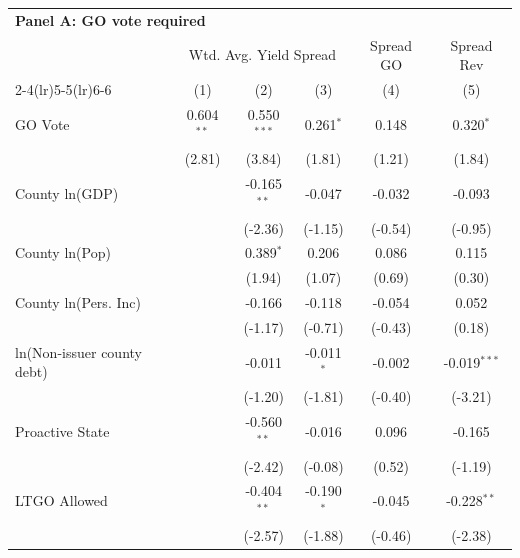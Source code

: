 \begingroup
\centering
\begin{tabular*}{\textwidth}{@{\extracolsep{\fill}}lccccc}
\multicolumn{6}{l}{\textbf{Panel A: GO vote required}}\\

\addlinespace
   \toprule
    & \multicolumn{3}{c}{Wtd. Avg. Yield Spread} & Spread GO & Spread Rev\\
   \cmidrule(lr){2-4}\cmidrule(lr){5-5}\cmidrule(lr){6-6}
                              & (1)          & (2)            & (3)            & (4)            & (5)\\  
   \midrule 
   GO Vote                    & 0.604$^{**}$ & 0.550$^{***}$  & 0.261$^{*}$    & 0.148          & 0.320$^{*}$\\   
                              & (2.81)      & (3.84)        & (1.81)        & (1.21)        & (1.84)\\   
   County ln(GDP)             &              & -0.165$^{**}$  & -0.047         & -0.032         & -0.093\\   
                              &              & (-2.36)       & (-1.15)       & (-0.54)       & (-0.95)\\   
   County ln(Pop)             &              & 0.389$^{*}$    & 0.206          & 0.086          & 0.115\\   
                              &              & (1.94)        & (1.07)        & (0.69)        & (0.30)\\   
   County ln(Pers. Inc)       &              & -0.166         & -0.118         & -0.054         & 0.052\\   
                              &              & (-1.17)       & (-0.71)       & (-0.43)       & (0.18)\\   
   ln(Non-issuer county debt) &              & -0.011         & -0.011$^{*}$   & -0.002         & -0.019$^{***}$\\   
                              &              & (-1.20)       & (-1.81)       & (-0.40)       & (-3.21)\\   
   Proactive State            &              & -0.560$^{**}$  & -0.016         & 0.096          & -0.165\\   
                              &              & (-2.42)       & (-0.08)       & (0.52)        & (-1.19)\\   
   LTGO Allowed               &              & -0.404$^{**}$  & -0.190$^{*}$   & -0.045         & -0.228$^{**}$\\   
                              &              & (-2.57)       & (-1.88)       & (-0.46)       & (-2.38)\\   

\end{tabular*}
